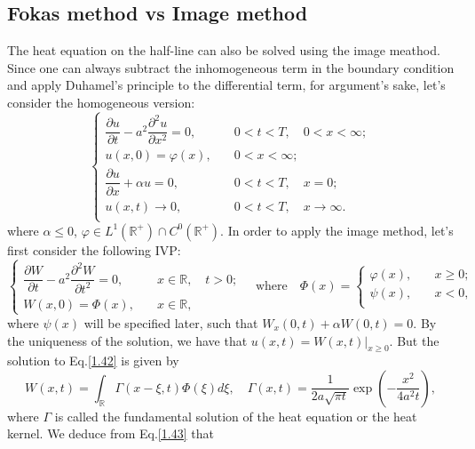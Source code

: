 \documentclass[12pt]{article}
\numberwithin{equation}{section}
\begin{document}
\subsection{Fokas method vs Image method}
The heat equation on the half-line can also be solved using the image meathod. Since one can always subtract the inhomogeneous term in the boundary condition and apply Duhamel's principle to the differential term, for argument's sake, let's consider the homogeneous version:
\begin{equation}\label{1.41}
    \begin{cases}
        \dfrac{\partial u}{\partial t}-a^2\dfrac{\partial^2 u}{\partial x^2}=0,\quad &0<t<T,\quad 0<x<\infty ;\\[1.5mm]
        u(x,0)=\varphi(x),\quad &0<x<\infty;\\[1.5mm]
        \dfrac{\partial u}{\partial x}+\alpha u=0,\quad &0<t<T,\quad x=0;\\[1.5mm]
        u(x,t)\to 0,\quad &0<t<T,\quad x\to\infty.\\[1.5mm]
    \end{cases}
\end{equation}
where $\alpha\leqslant 0$, $\varphi\in L^1{(\mathbb{R}^+)}\cap C^0{(\mathbb{R}^+)}$. In order to apply the image method, let's first consider the following IVP:
\begin{equation}\label{1.42}
    \begin{cases}
        \dfrac{\partial W}{\partial t}-a^2\dfrac{\partial^2 W}{\partial t^2}=0,\quad &x\in\mathbb{R},\quad t>0;\\[1.5mm]
        W(x,0)=\Phi(x),\quad &x\in\mathbb{R},
    \end{cases}
    \quad \text{where}\quad\Phi(x)=
    \begin{cases}
        \varphi(x),\quad &x\geqslant 0;\\
        \psi(x),\quad &x<0,\\
    \end{cases}
\end{equation}
where $\psi(x)$ will be specified later, such that $W_x(0,t)+\alpha W(0,t)=0$. By the uniqueness of the solution, we have that $u(x,t)=W(x,t)\vert_{x\geqslant 0}$. But the solution to Eq.\eqref{1.42} is given by 
\begin{equation}\label{1.43}
    W(x,t)=\int_{\mathbb{R}} \Gamma(x-\xi,t)\Phi(\xi)d\xi,\quad \Gamma(x,t)=\dfrac{1}{2a\sqrt{\pi t}}\exp\left(-\dfrac{x^2}{4a^2t}\right),
\end{equation}
where $\Gamma$ is called the fundamental solution of the heat equation or the heat kernel. We deduce from Eq.\eqref{1.43} that 
\end{document}

